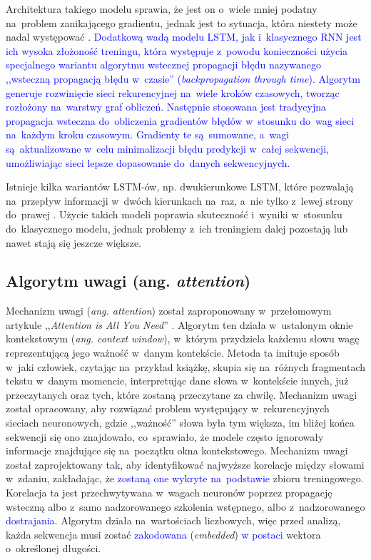 \documentclass[data-science]{agh-wi} %
\begin{document}
Architektura takiego modelu sprawia, że jest on o~wiele mniej podatny na~problem zanikającego gradientu, jednak jest to sytuacja, która niestety może nadal występować \cite{vanishing_gradient}. \textcolor{blue}{Dodatkową wadą modelu LSTM, jak i~klasycznego RNN jest ich wysoka złożoność treningu, która występuje z~powodu konieczności użycia specjalnego wariantu algorytmu wstecznej propagacji błędu nazywanego ,,wsteczną propagacją błędu w~czasie'' (\textit{backpropagation through time}). Algorytm generuje rozwinięcie sieci rekurencyjnej na~wiele kroków czasowych, tworząc rozłożony na~warstwy graf obliczeń. Następnie stosowana jest tradycyjna propagacja wsteczna do~obliczenia gradientów błędów w~stosunku do~wag sieci na~każdym kroku czasowym. Gradienty te są~sumowane, a~wagi są~aktualizowane w~celu minimalizacji błędu predykcji w~całej sekwencji, umożliwiając sieci lepsze dopasowanie do~danych sekwencyjnych.}

Istnieje kilka wariantów LSTM-ów, np. dwukierunkowe LSTM, które pozwalają na~przepływ informacji w~dwóch kierunkach na~raz, a~nie tylko z~lewej strony do~prawej \cite{bi_lstm}. Użycie takich modeli poprawia skuteczność i~wyniki w~stosunku do~klasycznego modelu, jednak problemy z~ich treningiem dalej pozostają lub nawet stają się jeszcze większe.

\subsection{Algorytm uwagi (ang. \textit{attention})}
\label{sec:attention}
Mechanizm uwagi (\textit{ang. attention}) został zaproponowany w~przełomowym artykule ,,\textit{Attention is All You Need}'' \cite{attention}. Algorytm ten działa w~ustalonym oknie kontekstowym (\textit{ang. context window}), w~którym przydziela każdemu słowu wagę reprezentującą jego ważność w~danym kontekście. Metoda ta imituje sposób w~jaki człowiek, czytając na~przykład książkę, skupia się na~różnych fragmentach tekstu w~danym momencie, interpretując dane słowa w~kontekście innych, już przeczytanych oraz tych, które zostaną przeczytane za chwilę. Mechanizm uwagi został opracowany, aby rozwiązać problem występujący w~rekurencyjnych sieciach neuronowych, gdzie ,,ważność'' słowa była tym większa, im bliżej końca sekwencji się ono znajdowało, co~sprawiało, że modele często ignorowały informacje znajdujące się na~początku okna kontekstowego. Mechanizm uwagi został zaprojektowany tak, aby identyfikować najwyższe korelacje między słowami w~zdaniu, zakładając, że \textcolor{blue}{zostaną one wykryte na~podstawie} zbioru treningowego. Korelacja ta jest przechwytywana w~wagach neuronów poprzez propagację wsteczną albo z~samo nadzorowanego szkolenia wstępnego, albo z~nadzorowanego \textcolor{blue}{dostrajania}. Algorytm działa na~wartościach liczbowych, więc przed analizą, każda sekwencja musi zostać \textcolor{blue}{zakodowana} (\textit{embedded}) \textcolor{blue}{w postaci} wektora o~określonej długości.
\end{document}
